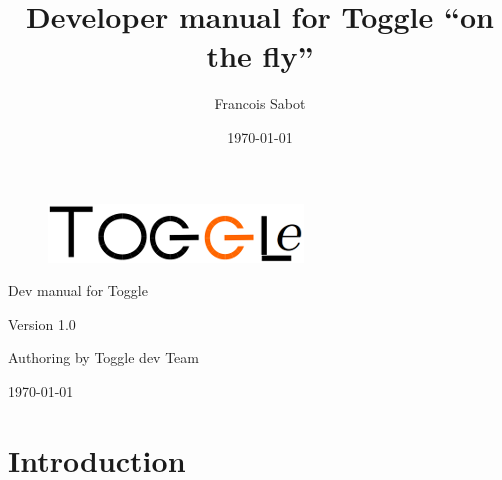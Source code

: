 \documentclass[a4paper,10pt]{report}
\title{Developer manual for Toggle ``on the fly''}
\author{Francois Sabot}
\date{\today}
\begin{document}
\begin{titlepage}



  \begin{figure}
    \begin{center}
      \includegraphics[width=1\linewidth]{images/toggleLogoSmall.png}
    \end{center}
  \end{figure}


  \begin{center}

     \Huge{Dev manual for Toggle}
     \newline
     \newline
     \newline
  \end{center}
  
  \begin{center}
    \huge{Version 1.0}
    \newline
    \newline
    \newline
  \end{center}
  
  \begin{center}
    \huge{Authoring by Toggle dev Team}
    \newline
    \newline
    \newline
  \end{center}
  
  \begin{center}
    \large{\today}
  \end{center}

\end{titlepage}

\newpage

\tableofcontents

\chapter{Introduction}
\end{document}
